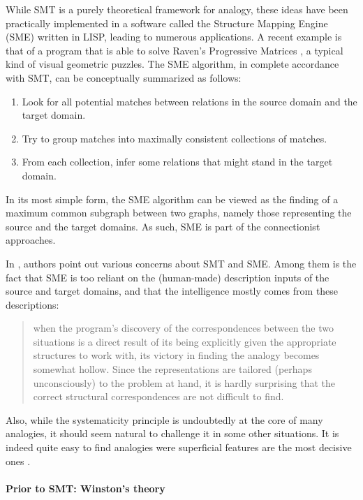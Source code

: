 While SMT is a purely theoretical framework for analogy, these ideas have been
practically implemented in a software called the Structure Mapping Engine (SME)
\cite{FalForKenGen89} written in LISP, leading to numerous applications. A
recent example is that of a program that is able to solve Raven's Progressive
Matrices \cite{LovForUsh10}, a typical kind of visual geometric
puzzles. The SME algorithm, in complete accordance with SMT, can be
conceptually summarized as follows:
\begin{enumerate}
    \item Look for all potential matches between relations in the source domain
      and the target domain.
    \item Try to group matches into maximally consistent collections of
      matches.
    \item From each collection, infer some relations that might stand in the
      target domain.
\end{enumerate}
In its most simple form, the SME algorithm can be viewed as the finding of a
maximum common subgraph between two graphs, namely those representing the
source and the target domains. As such, SME is part of the connectionist
approaches.

In  \cite{ChaFreHof92}, authors point out various concerns about SMT and SME.
Among them is the fact that SME is too reliant on the (human-made) description
inputs of the source and target domains, and that the intelligence mostly comes
from these descriptions:

\begin{quote}
  when the program's discovery of the correspondences between the two situations
  is a direct result of its being explicitly given the appropriate structures
  to work with, its victory in finding the analogy becomes somewhat hollow.
  Since the representations are tailored (perhaps unconsciously) to the problem
  at hand, it is hardly surprising that the correct structural correspondences
  are not difficult to find.
\end{quote}

Also, while the systematicity principle is undoubtedly at the core of many
analogies, it should seem natural to challenge it in some other situations. It
is indeed quite easy to find analogies were superficial features are the most
decisive ones \cite{Bar10}.

\paragraph{Prior to SMT: Winston's theory\\}

